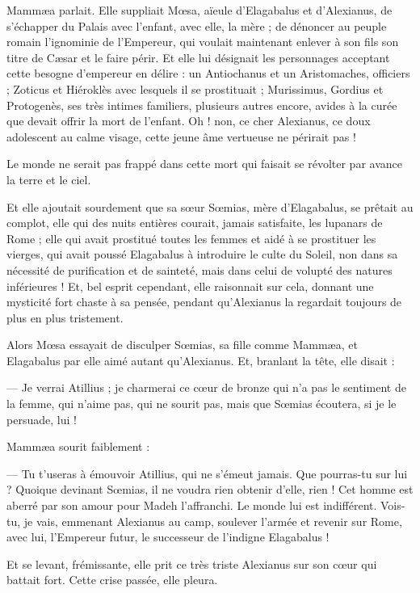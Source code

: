 \documentclass[a4paper, 11pt, oneside, polutonikogreek, french]{article}
\begin{document}
Mammæa parlait. Elle suppliait Mœsa, aïeule d'Elagabalus et d'Alexianus, de s'échapper du Palais avec l'enfant, avec elle, la mère ; de dénoncer au peuple romain l'ignominie de l'Empereur, qui voulait maintenant enlever à son fils son titre de Cæsar et le faire périr. Et elle lui désignait les personnages acceptant cette besogne d'empereur en délire : un Antiochanus et un Aristomaches, officiers ; Zoticus et Hiéroklès avec lesquels il se prostituait ; Murissimus, Gordius et Protogenès, ses très intimes familiers, plusieurs autres encore, avides à la curée que devait offrir la mort de l'enfant. Oh ! non, ce cher Alexianus, ce doux adolescent au calme visage, cette jeune âme vertueuse ne périrait pas !

Le monde ne serait pas frappé dans cette mort qui faisait se révolter par avance la terre et le ciel.

Et elle ajoutait sourdement que sa sœur Sœmias, mère d'Elagabalus, se prêtait au complot, elle qui des nuits entières courait, jamais satisfaite, les lupanars de Rome ; elle qui avait prostitué toutes les femmes et aidé à se prostituer les vierges, qui avait poussé Elagabalus à introduire le culte du Soleil, non dans sa nécessité de purification et de sainteté, mais dans celui de volupté des natures inférieures ! Et, bel esprit cependant, elle raisonnait sur cela, donnant une mysticité fort chaste à sa pensée, pendant qu'Alexianus la regardait toujours de plus en plus tristement.

Alors Mœsa essayait de disculper Sœmias, sa fille comme Mammæa, et Elagabalus par elle aimé autant qu'Alexianus. Et, branlant la tête, elle disait :

--- Je verrai Atillius ; je charmerai ce cœur de bronze qui n'a pas le sentiment de la femme, qui n'aime pas, qui ne sourit pas, mais que Sœmias écoutera, si je le persuade, lui !

Mammæa sourit faiblement :

--- Tu t'useras à émouvoir Atillius, qui ne s'émeut jamais. Que pourras-tu sur lui ? Quoique devinant Sœmias, il ne voudra rien obtenir d'elle, rien ! Cet homme est aberré par son amour pour Madeh l'affranchi. Le monde lui est indifférent. Vois-tu, je vais, emmenant Alexianus au camp, soulever l'armée et revenir sur Rome, avec lui, l'Empereur futur, le successeur de l'indigne Elagabalus !

Et se levant, frémissante, elle prit ce très triste Alexianus sur son cœur qui battait fort. Cette crise passée, elle pleura.
\end{document}
